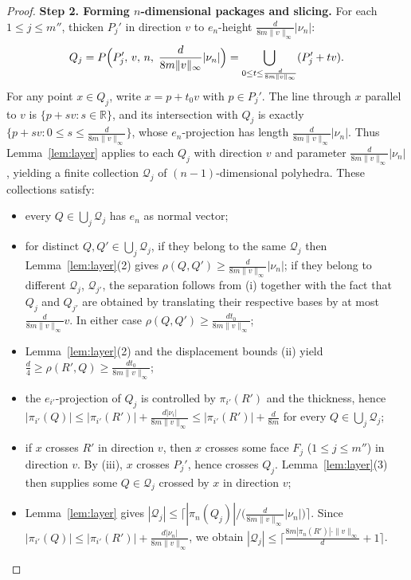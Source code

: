\documentclass{amsart}
\theoremstyle{definition}
\begin{document}
\begin{proof}
\medskip\noindent
\textbf{Step 2.  Forming $n$-dimensional packages and slicing.}
For each $1\leq j\leq m''$, thicken $P_j'$ in direction $v$ to
$e_n$-height $\frac{d}{8m\|v\|_\infty}|\nu_n|$:
\[
Q_j=P\Bigl(P_j',\, v,\, n,\; \frac{d}{8m\|v\|_\infty}|\nu_n|\Bigr)
=\bigcup_{0\leq t\leq \frac{d}{8m\|v\|_\infty}}(P_j'+t v).
\]
For any point $x\in Q_j$, write $x=p+t_0 v$ with $p\in P_j'$.  The line
through $x$ parallel to $v$ is $\{p+sv\colon s\in\mathbb{R}\}$, and its
intersection with $Q_j$ is exactly $\{p+sv\colon
0\leq s\leq\frac{d}{8m\|v\|_\infty}\}$, whose $e_n$-projection has length
$\frac{d}{8m\|v\|_\infty}|\nu_n|$.  Thus Lemma~\ref{lem:layer} applies to
each $Q_j$ with direction $v$ and parameter $\frac{d}{8m\|v\|_\infty}|\nu_n|$,
yielding a finite collection $\mathcal{Q}_j$ of $(n-1)$-dimensional polyhedra.
These collections satisfy:
\begin{itemize}
\item[(iv)] every $Q\in\bigcup_j\mathcal{Q}_j$ has $e_n$ as normal vector;
\item[(v)] for distinct $Q,Q'\in\bigcup_j\mathcal{Q}_j$, if they belong to
the same $\mathcal{Q}_j$ then Lemma~\ref{lem:layer}(2) gives
$\rho(Q,Q')\geq\frac{d}{8m\|v\|_\infty}|\nu_n|$; if they belong to different
$\mathcal{Q}_j$, $\mathcal{Q}_{j'}$, the separation follows from (i) together
with the fact that $Q_j$ and $Q_{j'}$ are obtained by translating their
respective bases by at most $\frac{d}{8m\|v\|_\infty}v$.  In either case
$\rho(Q,Q')\geq\frac{d t_0}{8m\|v\|_\infty}$;
\item[(vi)] Lemma~\ref{lem:layer}(2) and the displacement bounds (ii) yield
$\frac{d}{4}\geq\rho(R',Q)\geq\frac{d t_0}{8m\|v\|_\infty}$;
\item[(vii)] the $e_{i'}$-projection of $Q_j$
is controlled by $\pi_{i'}(R')$ and the thickness,
hence $|\pi_{i'}(Q)|\leq |\pi_{i'}(R')|+\frac{d|\nu_i|}{8m\|v\|_{\infty}}\leq |\pi_{i'}(R')|+\frac{d}{8m}$ for every
$Q\in\bigcup_j\mathcal{Q}_j$;
\item[(viii)] if $x$ crosses $R'$ in direction $v$, then $x$ crosses some
face $F_j$ ($1\leq j\leq m''$) in direction $v$.  By (iii), $x$ crosses
$P_j'$, hence crosses $Q_j$.
Lemma~\ref{lem:layer}(3) then supplies some $Q\in\mathcal{Q}_j$ crossed by
$x$ in direction $v$;
\item[(ix)] Lemma~\ref{lem:layer} gives
$|\mathcal{Q}_j|\leq\bigl\lceil |\pi_n(Q_j)|/
\bigl(\frac{d}{8m\|v\|_\infty}|\nu_n|\bigr)\bigr\rceil$.  Since
$|\pi_{i'}(Q)|\leq |\pi_{i'}(R')|+\frac{d|\nu_n|}{8m\|v\|_{\infty}}$, we obtain
$|\mathcal{Q}_j|\leq
\bigl\lceil\frac{8m|\pi_n(R')|\cdot\|v\|_\infty}{d}+1\bigr\rceil$.
\end{itemize}


\end{proof}
\end{document}

